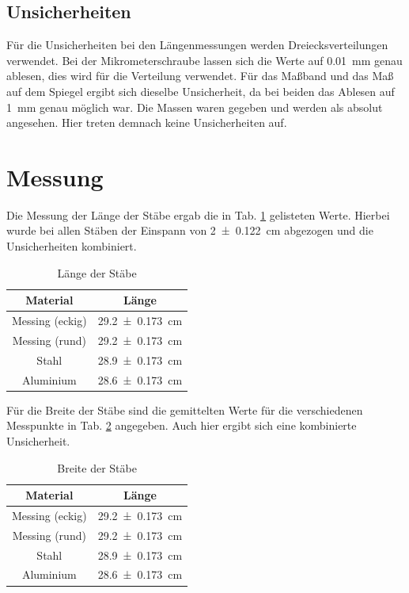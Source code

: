 		\subsection*{Unsicherheiten}
		Für die Unsicherheiten bei den Längenmessungen werden Dreiecksverteilungen verwendet. Bei der Mikrometerschraube lassen sich die Werte auf \SI{0,01}{\mm} genau ablesen, dies wird für die Verteilung verwendet. Für das Maßband und das Maß auf dem Spiegel ergibt sich dieselbe Unsicherheit, da bei beiden das Ablesen auf \SI{1}{\mm} genau möglich war.
		Die Massen waren gegeben und werden als absolut angesehen. Hier treten demnach keine Unsicherheiten auf.	
	\section{Messung}
		
		Die Messung der Länge der Stäbe ergab die in Tab. \ref{tab:Stablängen} gelisteten Werte. Hierbei wurde bei allen Stäben der Einspann von \SI{2+-0,122}{\cm} abgezogen und die Unsicherheiten kombiniert.
		\begin{table}[h]
			\caption{Länge der Stäbe}
			\centering
			\label{tab:Stablängen}
			\begin{tabular}{c|c}
				{Material} & {Länge}\\
				\hline
				{Messing (eckig)} & \SI{29,2+-0,173}{\cm}\\
				{Messing (rund)} &  \SI{29,2+-0,173}{\cm}\\
				{Stahl} & \SI{28,9+-0,173}{\cm}\\
				{Aluminium} & \SI{28,6+-0,173}{\cm}\\		
			\end{tabular}
		\end{table}
	
		Für die Breite der Stäbe sind die gemittelten Werte für die verschiedenen Messpunkte in Tab. \ref{tab:Stabbreiten} angegeben. Auch hier ergibt sich  eine kombinierte Unsicherheit.
		\begin{table}[h]
			\caption{Breite der Stäbe}
			\centering
			\label{tab:Stabbreiten}
			\begin{tabular}{c|c}
				{Material} & {Länge}\\
				\hline
				{Messing (eckig)} & \SI{29,2+-0,173}{\cm}\\
				{Messing (rund)} &  \SI{29,2+-0,173}{\cm}\\
				{Stahl} & \SI{28,9+-0,173}{\cm}\\
				{Aluminium} & \SI{28,6+-0,173}{\cm}\\		
			\end{tabular}
		\end{table}
		
